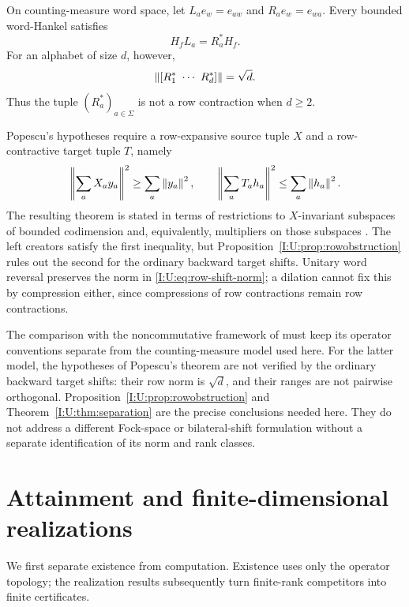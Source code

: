 \begin{proposition}\label{I:U:prop:rowobstruction}
On counting-measure word space, let
$L_ae_w=e_{aw}$ and $R_ae_w=e_{wa}$.  Every bounded word-Hankel satisfies
\[
 H_fL_a=R_a^*H_f.
\]
For an alphabet of size $d$, however,
\begin{equation}\label{I:U:eq:row-shift-norm}
 \left\lVert[R_1^*\ \cdots\ R_d^*]\right\rVert=\sqrt d.
\end{equation}
Thus the tuple $(R_a^*)_{a\in\Sigma}$ is not a row contraction when
$d\ge2$.
\end{proposition}


Popescu's hypotheses require a row-expansive source tuple $X$ and a
row-contractive target tuple $T$, namely
\[
 \left\lVert\sum_aX_ay_a\right\rVert^2\ge\sum_a\left\lVert y_a\right\rVert^2,
 \qquad
 \left\lVert\sum_aT_ah_a\right\rVert^2\le\sum_a\left\lVert h_a\right\rVert^2.
\]
The resulting theorem is stated in terms of restrictions to
$X$-invariant subspaces of bounded codimension and, equivalently,
multipliers on those subspaces
\cite[Theorems~5.3--5.4]{popescu2003}.
The left creators satisfy the first inequality, but
Proposition~\ref{I:U:prop:rowobstruction} rules out the second for the
ordinary backward target shifts.  Unitary word reversal preserves
the norm in \eqref{I:U:eq:row-shift-norm}; a dilation cannot fix this by
compression either, since compressions of row contractions remain
row contractions.

The comparison with the noncommutative framework of
\cite[Theorems~7--10]{lacroce2022} must keep its operator conventions
separate from the counting-measure model used here. For the latter model,
the hypotheses of Popescu's theorem are not verified by the ordinary
backward target shifts: their row norm is $\sqrt d$, and their ranges
are not pairwise orthogonal. Proposition~\ref{I:U:prop:rowobstruction}
and Theorem~\ref{I:U:thm:separation} are the precise conclusions needed
here. They do not address a different Fock-space or bilateral-shift
formulation without a separate identification of its norm and rank classes.

\section{Attainment and finite-dimensional realizations}\label{I:U:sec:realization}
We first separate existence from computation. Existence uses only the operator topology; the realization results subsequently turn finite-rank competitors into finite certificates.

